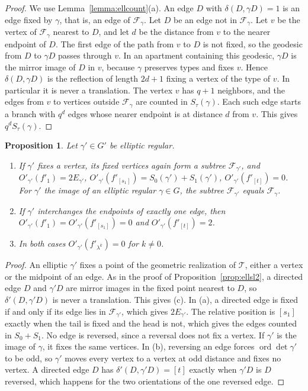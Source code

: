 \documentclass[12pt,letterpaper]{amsart}
\numberwithin{equation}{section}
\newtheorem{proposition}[theorem]{Proposition}
\theoremstyle{definition}
\theoremstyle{remark}
\DeclareMathOperator{\ord}{ord}
\begin{document}
\begin{proof}
We use Lemma~\ref{lemma:ellcount}(a). An edge $D$ with
$\delta(D,\gamma D)=1$ is an edge fixed by $\gamma$, that is, an edge
of $\mathcal F_\gamma$. Let $D$ be an edge not in $\mathcal
F_\gamma$. Let $v$ be the vertex of $\mathcal F_\gamma$ nearest to
$D$, and let $d$ be the distance from $v$ to the nearer endpoint of
$D$. The first edge of the path from $v$ to $D$ is not fixed, so the
geodesic from $D$ to $\gamma D$ passes through $v$. In an apartment
containing this geodesic, $\gamma D$ is the mirror image of $D$ in $v$,
because $\gamma$ preserves types and fixes $v$. Hence $\delta(D,\gamma
D)$ is the reflection of length $2d+1$ fixing a vertex of the type of
$v$. In particular it is never a translation. The vertex $v$ has
$q+1$ neighbors, and the edges from $v$ to vertices outside $\mathcal
F_\gamma$ are counted in $S_\tau(\gamma)$. Each such edge starts a
branch with $q^d$ edges whose nearer endpoint is at distance $d$ from
$v$. This gives $q^dS_\tau(\gamma)$.
\end{proof}

\begin{proposition}
\label{prop:ellpgl}
Let $\gamma'\in G'$ be elliptic regular.
\begin{enumerate}[leftmargin=2em,label=(\alph*)]
\item If $\gamma'$ fixes a vertex, its fixed vertices again form a
subtree $\mathcal F_{\gamma'}$, and $O'_{\gamma'}(f'_1)=2E_{\gamma'}$,
$O'_{\gamma'}(f'_{[s_1]})=S_0(\gamma')+S_1(\gamma')$,
$O'_{\gamma'}(f'_{[t]})=0$. For $\gamma'$ the image of an elliptic
regular $\gamma\in G$, the subtree $\mathcal F_{\gamma'}$ equals
$\mathcal F_\gamma$.
\item If $\gamma'$ interchanges the endpoints of exactly one edge, then
$O'_{\gamma'}(f'_1)=O'_{\gamma'}(f'_{[s_1]})=0$ and
$O'_{\gamma'}(f'_{[t]})=2$.
\item In both cases $O'_{\gamma'}(f'_{\lambda^k})=0$ for $k\neq0$.
\end{enumerate}
\end{proposition}

\begin{proof}
An elliptic $\gamma'$ fixes a point of the geometric realization of
$\mathcal T$, either a vertex or the midpoint of an edge. As in the
proof of Proposition~\ref{prop:ellsl2}, a directed edge $D$ and
$\gamma'D$ are mirror images in the fixed point nearest to $D$, so
$\delta'(D,\gamma'D)$ is never a translation. This gives (c). In (a),
a directed edge is fixed if and only if its edge lies in $\mathcal
F_{\gamma'}$, which gives $2E_{\gamma'}$. The relative position is
$[s_1]$ exactly when the tail is fixed and the head is not, which gives
the edges counted in $S_0+S_1$. No edge is reversed, since a reversal
does not fix a vertex. If $\gamma'$ is the image of $\gamma$, it fixes
the same vertices. In (b), reversing an edge forces $\ord\det\gamma'$
to be odd, so $\gamma'$ moves every vertex to a vertex at odd distance
and fixes no vertex. A directed edge $D$ has
$\delta'(D,\gamma'D)=[t]$ exactly when $\gamma'D$ is $D$ reversed, which
happens for the two orientations of the one reversed edge.
\end{proof}
\end{document}
